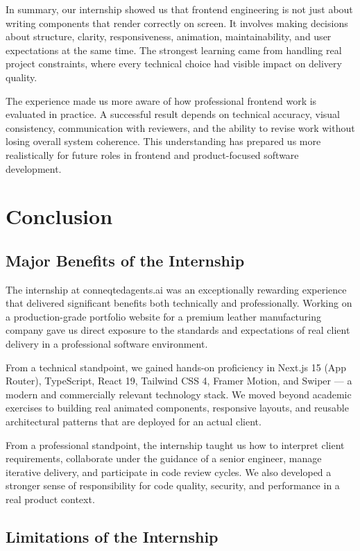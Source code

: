 \documentclass[12pt, oneside, a4paper]{book}
\begin{document}
\begin{doublespace}
In summary, our internship showed us that frontend engineering is not just about writing
components that render correctly on screen. It involves making decisions about structure,
clarity, responsiveness, animation, maintainability, and user expectations at the same
time. The strongest learning came from handling real project constraints, where every
technical choice had visible impact on delivery quality.

The experience made us more aware of how professional frontend work is evaluated in
practice. A successful result depends on technical accuracy, visual consistency,
communication with reviewers, and the ability to revise work without losing overall
system coherence. This understanding has prepared us more realistically for future roles
in frontend and product-focused software development.

\chapter{Conclusion}

\section{Major Benefits of the Internship}

The internship at conneqtedagents.ai was an exceptionally rewarding experience that
delivered significant benefits both technically and professionally. Working on a
production-grade portfolio website for a premium leather manufacturing company gave us
direct exposure to the standards and expectations of real client delivery in a
professional software environment.

From a technical standpoint, we gained hands-on proficiency in Next.js 15 (App Router),
TypeScript, React 19, Tailwind CSS 4, Framer Motion, and Swiper --- a modern and
commercially relevant technology stack. We moved beyond academic exercises to building
real animated components, responsive layouts, and reusable architectural patterns that
are deployed for an actual client.

From a professional standpoint, the internship taught us how to interpret client
requirements, collaborate under the guidance of a senior engineer, manage iterative
delivery, and participate in code review cycles. We also developed a stronger sense of
responsibility for code quality, security, and performance in a real product context.

\section{Limitations of the Internship}


\end{doublespace}
\end{document}
